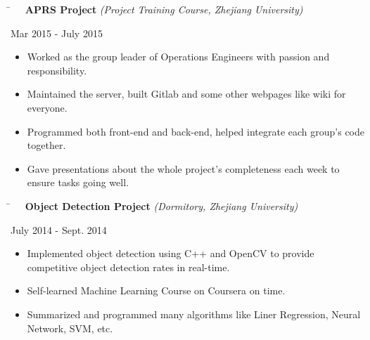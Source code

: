 \documentclass[10pt]{article} %
\begin{document}
\parbox{0.5\textwidth}{
\begin{tabbing}
\hspace{4mm} \= \kill
\>\textbf{\ \ APRS Project} \textit{(Project Training Course, Zhejiang University)}
\end{tabbing}
}
\hfill
\parbox{0.5\textwidth}{
\begin{tabbing}
Mar 2015 - July 2015
\end{tabbing}
}
\vspace{-3mm}
\begin{itemize}[leftmargin=16mm]
        \item Worked as the group leader of Operations Engineers with passion and responsibility.
        \item Maintained the server, built Gitlab and some other webpages like wiki for everyone.
        \item Programmed both front-end and back-end, helped integrate each group's code together.
        \item Gave presentations about the whole project's completeness each week to ensure tasks going well.
\end{itemize}

\parbox{0.5\textwidth}{
\begin{tabbing}
\hspace{4mm} \= \kill
\>\textbf{\ \ Object Detection Project} \textit{(Dormitory, Zhejiang University)}
\end{tabbing}
}
\hfill
\parbox{0.5\textwidth}{
\begin{tabbing}
July 2014 - Sept. 2014
\end{tabbing}
}
\vspace{-3mm}
\begin{itemize}[leftmargin=16mm]
        \item Implemented object detection using C++ and OpenCV to provide competitive object detection rates in real-time.
        \item Self-learned Machine Learning Course on Coursera on time.
        \item Summarized and programmed many algorithms like Liner Regression, Neural Network, SVM, etc.
\end{itemize}
\end{document}
